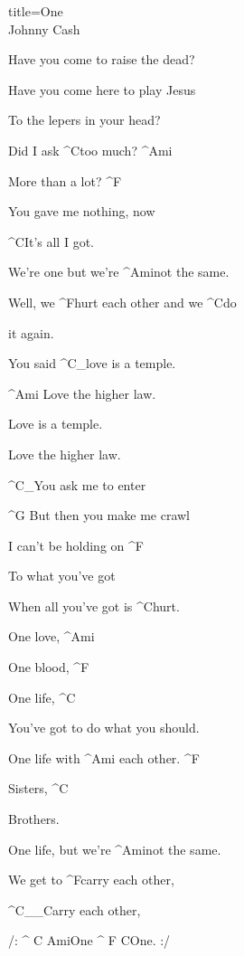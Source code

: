 \begin{song}{title=\predtitle\centering One \\\large Johnny Cash  \vspace*{-1.6cm}}
\begin{centerjustified}
\begin{varwidth}[t]{0.55\textwidth}
{	Have you come to raise the dead?

	Have you come here to play Jesus

	To the lepers in your head?

}
\end{varwidth}\mezisloupci\begin{varwidth}[t]{0.55\textwidth}\setlength{\parindent}{0.25cm}\vspace*{0.0cm}  %
{\setlength{\parskip}{0pt}

	Did I ask ^{\small C}too much? ^{\small Ami}

	More than a lot? ^{\small F}

	You gave me nothing, now
	   
	^{\small C}It's all I got.

	We're one but we're ^{\small Ami}not the same.

	Well, we ^{\small F}hurt each other and we ^{\small C}do 

	it again. 
 
	You said ^{\small C{\color{white}\_}}love is a temple.

	^{\small Ami\,\,}Love the higher law.

	Love is a temple.	

	Love the higher law.

	^{\small C{\color{white}\_}}You ask me to enter

	^{\small G\,\,}But then you make me crawl

	I can't be holding on ^{\small F}
                  
	To what you've got

	When all you've got is ^{\small C}hurt.
  
	One love, ^{\small Ami}

	One blood, ^{\small F}

	One life, ^{\small C}
 
	You've got to do what you should.

	One life with ^{\small Ami\,\,}each other. ^{\small F}
 
 	Sisters, ^{\small C}
 
	Brothers.
   
	One life, but we're ^{\small Ami}not the same.

	We get to ^{\small F}carry each other,

  	^{\small C{\color{white}\_\_}}Carry each other,

  	/: ^{\small \,\,C\,\,Ami}One ^{\small \,\,F\,\,C}One. :/


}
\end{varwidth}
\end{centerjustified}
\setcounter{Slokočet}{0}
\end{song}
